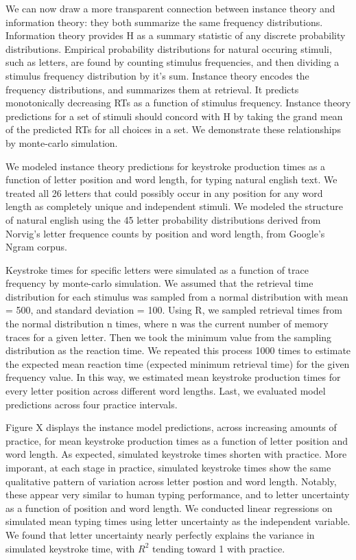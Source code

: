\documentclass[floatsintext,man]{apa6}
\theoremstyle{definition}
\theoremstyle{definition}
\theoremstyle{definition}
\theoremstyle{remark}
\begin{document}
We can now draw a more transparent connection between instance theory
and information theory: they both summarize the same frequency
distributions. Information theory provides H as a summary statistic of
any discrete probability distributions. Empirical probability
distributions for natural occuring stimuli, such as letters, are found
by counting stimulus frequencies, and then dividing a stimulus frequency
distribution by it's sum. Instance theory encodes the frequency
distributions, and summarizes them at retrieval. It predicts
monotonically decreasing RTs as a function of stimulus frequency.
Instance theory predictions for a set of stimuli should concord with H
by taking the grand mean of the predicted RTs for all choices in a set.
We demonstrate these relationships by monte-carlo simulation.

We modeled instance theory predictions for keystroke production times as
a function of letter position and word length, for typing natural
english text. We treated all 26 letters that could possibly occur in any
position for any word length as completely unique and independent
stimuli. We modeled the structure of natural english using the 45 letter
probability distributions derived from Norvig's letter frequence counts
by position and word length, from Google's Ngram corpus.

Keystroke times for specific letters were simulated as a function of
trace frequency by monte-carlo simulation. We assumed that the retrieval
time distribution for each stimulus was sampled from a normal
distribution with mean = 500, and standard deviation = 100. Using R, we
sampled retrieval times from the normal distribution n times, where n
was the current number of memory traces for a given letter. Then we took
the minimum value from the sampling distribution as the reaction time.
We repeated this process 1000 times to estimate the expected mean
reaction time (expected minimum retrieval time) for the given frequency
value. In this way, we estimated mean keystroke production times for
every letter position across different word lengths. Last, we evaluated
model predictions across four practice intervals.

Figure X displays the instance model predictions, across increasing
amounts of practice, for mean keystroke production times as a function
of letter position and word length. As expected, simulated keystroke
times shorten with practice. More imporant, at each stage in practice,
simulated keystroke times show the same qualitative pattern of variation
across letter postion and word length. Notably, these appear very
similar to human typing performance, and to letter uncertainty as a
function of position and word length. We conducted linear regressions on
simulated mean typing times using letter uncertainty as the independent
variable. We found that letter uncertainty nearly perfectly explains the
variance in simulated keystroke time, with \(R^2\) tending toward 1 with
practice.
\end{document}
